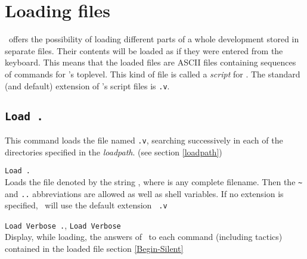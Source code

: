 

\section{Loading files}

\Coq\ offers the possibility of loading different
parts of a whole development stored in separate files. Their contents
will be loaded as if they were entered from the keyboard. This means
that the loaded files are ASCII files containing sequences of commands
for \Coq's toplevel. This kind of file is called a {\em script} for
\Coq{}. The standard (and default) extension of
\Coq's script files is {\tt .v}.

\subsection{\tt Load {\ident}.}
\label{Load}
This command loads the file named {\ident}{\tt .v}, searching
successively in each of the directories specified in the {\em
  loadpath}. (see section \ref{loadpath})

\begin{Variants}
\item {\tt Load {\str}.}\label{Load-str}\\
  Loads the file denoted by the string {\str}, where {\str} is any
  complete filename. Then the \verb.~. and {\tt ..}
  abbreviations are allowed as well as shell variables. If no
  extension is specified, \Coq\ will use the default extension {\tt
    .v}
\item {\tt Load Verbose {\ident}.}, 
  {\tt Load Verbose {\str}}\\
  Display, while loading, the answers of \Coq\ to each command
  (including tactics) contained in the loaded file
  \SeeAlso section \ref{Begin-Silent}
\end{Variants}

